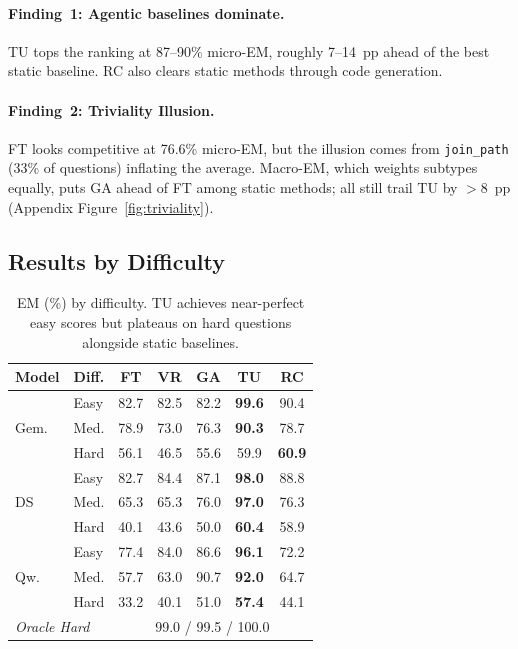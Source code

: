 \paragraph{Finding~1: Agentic baselines dominate.}
TU tops the ranking at 87--90\% micro-EM, roughly 7--14~pp ahead of the best
static baseline.  RC also clears static methods through code generation.

\paragraph{Finding~2: Triviality Illusion.}
FT looks competitive at 76.6\% micro-EM, but the illusion comes from
\texttt{join\_path} (33\% of questions) inflating the average.
Macro-EM, which weights subtypes equally, puts GA ahead of FT among
static methods; all still trail TU by $>$8~pp (Appendix Figure~\ref{fig:triviality}).

\subsection{Results by Difficulty}

\begin{table}[t]
\centering
\caption{EM (\%) by difficulty. TU achieves near-perfect easy scores
but plateaus on hard questions alongside static baselines.}
\label{tab:difficulty}
\small
\begin{tabular}{@{}llccccc@{}}
\toprule
Model & Diff. & FT & VR & GA & TU & RC \\
\midrule
\multirow{3}{*}{Gem.}
  & Easy    & 82.7 & 82.5 & 82.2 & \textbf{99.6} & 90.4 \\
  & Med.    & 78.9 & 73.0 & 76.3 & \textbf{90.3} & 78.7 \\
  & Hard    & 56.1 & 46.5 & 55.6 & 59.9 & \textbf{60.9} \\
\midrule
\multirow{3}{*}{DS}
  & Easy    & 82.7 & 84.4 & 87.1 & \textbf{98.0} & 88.8 \\
  & Med.    & 65.3 & 65.3 & 76.0 & \textbf{97.0} & 76.3 \\
  & Hard    & 40.1 & 43.6 & 50.0 & \textbf{60.4} & 58.9 \\
\midrule
\multirow{3}{*}{Qw.}
  & Easy    & 77.4 & 84.0 & 86.6 & \textbf{96.1} & 72.2 \\
  & Med.    & 57.7 & 63.0 & 90.7 & \textbf{92.0} & 64.7 \\
  & Hard    & 33.2 & 40.1 & 51.0 & \textbf{57.4} & 44.1 \\
\midrule
\multicolumn{2}{l}{\textit{Oracle Hard}}
  & \multicolumn{5}{c}{99.0 / 99.5 / 100.0} \\
\bottomrule
\end{tabular}
\end{table}

